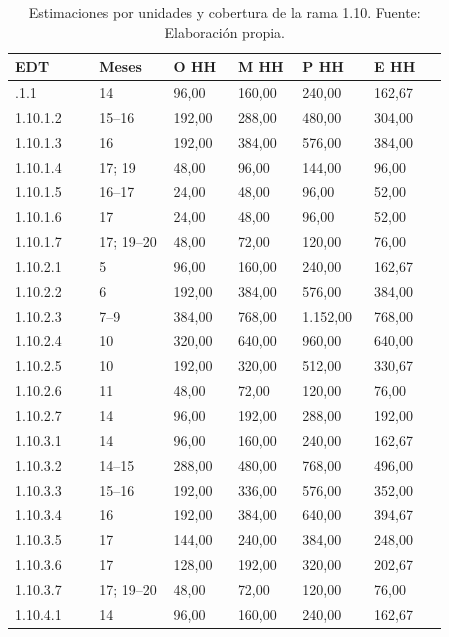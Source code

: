 \documentclass[11pt]{article}
\begin{document}
\begingroup
\small
\begin{longtable}{@{}p{0.17\linewidth}p{0.15\linewidth}p{0.13\linewidth}p{0.13\linewidth}p{0.13\linewidth}p{0.15\linewidth}@{}}
\caption[Estimaciones por unidades y cobertura de la rama 1.10]{Estimaciones por unidades y cobertura de la rama 1.10. Fuente: Elaboración propia.}\label{tab:t15-tareas-10}\\
\toprule
\textbf{EDT} & \textbf{Meses} & \textbf{O HH} & \textbf{M HH} & \textbf{P HH} & \textbf{E HH} \\
\midrule
\endhead
\bottomrule
\endlastfoot
1.10.1.1 & 14 & 96,00 & 160,00 & 240,00 & 162,67 \\
1.10.1.2 & 15--16 & 192,00 & 288,00 & 480,00 & 304,00 \\
1.10.1.3 & 16 & 192,00 & 384,00 & 576,00 & 384,00 \\
1.10.1.4 & 17; 19 & 48,00 & 96,00 & 144,00 & 96,00 \\
1.10.1.5 & 16--17 & 24,00 & 48,00 & 96,00 & 52,00 \\
1.10.1.6 & 17 & 24,00 & 48,00 & 96,00 & 52,00 \\
1.10.1.7 & 17; 19--20 & 48,00 & 72,00 & 120,00 & 76,00 \\
1.10.2.1 & 5 & 96,00 & 160,00 & 240,00 & 162,67 \\
1.10.2.2 & 6 & 192,00 & 384,00 & 576,00 & 384,00 \\
1.10.2.3 & 7--9 & 384,00 & 768,00 & 1.152,00 & 768,00 \\
1.10.2.4 & 10 & 320,00 & 640,00 & 960,00 & 640,00 \\
1.10.2.5 & 10 & 192,00 & 320,00 & 512,00 & 330,67 \\
1.10.2.6 & 11 & 48,00 & 72,00 & 120,00 & 76,00 \\
1.10.2.7 & 14 & 96,00 & 192,00 & 288,00 & 192,00 \\
1.10.3.1 & 14 & 96,00 & 160,00 & 240,00 & 162,67 \\
1.10.3.2 & 14--15 & 288,00 & 480,00 & 768,00 & 496,00 \\
1.10.3.3 & 15--16 & 192,00 & 336,00 & 576,00 & 352,00 \\
1.10.3.4 & 16 & 192,00 & 384,00 & 640,00 & 394,67 \\
1.10.3.5 & 17 & 144,00 & 240,00 & 384,00 & 248,00 \\
1.10.3.6 & 17 & 128,00 & 192,00 & 320,00 & 202,67 \\
1.10.3.7 & 17; 19--20 & 48,00 & 72,00 & 120,00 & 76,00 \\
1.10.4.1 & 14 & 96,00 & 160,00 & 240,00 & 162,67 \\

\end{longtable}
\end{document}
